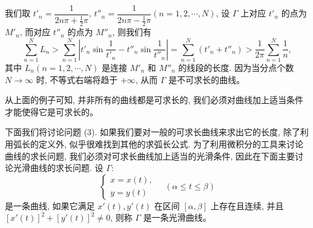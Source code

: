 \documentclass[UTF8, 12pt, fontset=fandol, oneside]{ctexart}
\begin{document}
我们取 $t'_n=\dfrac{1}{2n\pi+\frac12\pi}$, $t''_n=\dfrac{1}{2n\pi-\frac12\pi}(n=1,2,\cdots,N)$, 设 $\Gamma$ 上对应 $t'_n$ 的点为 $M'_n$, 而对应 $t''_n$ 的点为 $M''_n$, 则我们有
\[
  \sum_{n=1}^N L_n
  >\sum_{n=1}^N\left|t'_n\sin\frac{1}{t'_n}-t''_n\sin\frac{1}{t''_n}\right|
  =\sum_{n=1}^N(t'_n+t''_n)>\frac{1}{2\pi}\sum_{n=1}^N\frac{1}{n},
\]
其中 $L_n(n=1,2,\cdots,N)$ 是连接 $M'_n$ 和 $M''_n$ 的线段的长度. 因为当分点个数 $N\to\infty$ 时, 不等式右端将趋于 $+\infty$, 从而 $\Gamma$ 是不可求长的曲线。

从上面的例子可知, 并非所有的曲线都是可求长的, 我们必须对曲线加上适当条件才能使得它是可求长的。

下面我们将讨论问题 (3). 如果我们要对一般的可求长曲线来求出它的长度, 除了利用弧长的定义外, 似乎很难找到其他的求弧长公式. 为了利用微积分的工具来讨论曲线的求长问题, 我们必须对可求长曲线加上适当的光滑条件, 因此在下面主要讨论光滑曲线的求长问题. 设 $\Gamma$:
\[
  \begin{cases}
    x=x(t),\\
    y=y(t)
  \end{cases}
  \quad(\alpha\leq t\leq\beta)
\]
是一条曲线, 如果它满足 $x'(t),y'(t)$ 在区间 $[\alpha,\beta]$ 上存在且连续, 并且 $[x'(t)]^2+[y'(t)]^2\neq0$, 则称 $\Gamma$ 是一条光滑曲线。
\end{document}
